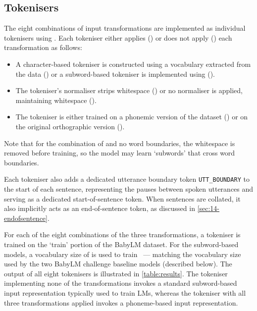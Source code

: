 \subsection{Tokenisers}\label{sec:14-tokenisers}

The eight combinations of input transformations are implemented as individual tokenisers using . Each tokeniser either applies (\cmark) or does not apply (\xmark) each transformation as follows:

\begin{itemize}
\setlength\itemsep{0.1em}
    \item {} A character-based tokeniser is constructed using a vocabulary extracted from the data (\cmark) or a subword-based tokeniser is implemented using \bpe (\xmark).
    \item {} The tokeniser's normaliser strips whitespace (\cmark) or no normaliser is applied, maintaining whitespace (\xmark).
    \item {} The tokeniser is either trained on a phonemic version of the dataset (\cmark) or on the original orthographic version (\xmark).
\end{itemize}

Note that for the combination of \bpe and no word boundaries, the whitespace is removed before training, so the model may learn `subwords' that cross word boundaries.

Each tokeniser also adds a dedicated utterance boundary token \texttt{UTT\_BOUNDARY} to the start of each sentence, representing the pauses between spoken utterances and serving as a dedicated start-of-sentence token. When sentences are collated, it also implicitly acts as an end-of-sentence token, as discussed in \cref{sec:14-endofsentence}.

For each of the eight combinations of the three transformations, a tokeniser is trained on the `train' portion of the BabyLM dataset. For the subword-based models, a vocabulary size of  is used to train \bpe~--- matching the vocabulary size used by the two BabyLM challenge baseline models (described below). The output of all eight tokenisers is illustrated in \cref{table:results}. The tokeniser implementing none of the transformations invokes a standard subword-based input representation typically used to train LMs, whereas the tokeniser with all three transformations applied invokes a phoneme-based input representation.

